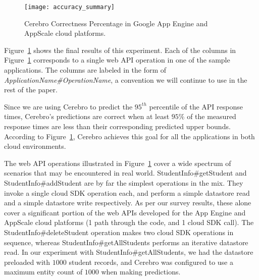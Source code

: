 \begin{figure}
\centering
\texttt{[image: accuracy\_summary]}
\caption{Cerebro Correctness Percentage in Google App Engine and AppScale cloud platforms.}
\label{fig:accuracy_summary}
\vspace{-0.2in}
\end{figure}

Figure~\ref{fig:accuracy_summary} shows the final results of this experiment.
Each of the columns in Figure~\ref{fig:accuracy_summary} corresponds 
to a single web API operation in 
one of the sample applications. The columns are labeled in the 
form of \textit{ApplicationName\#OperationName}, a convention 
we will continue to use in the rest of the paper. %

Since we are using Cerebro to predict the $95^{th}$ percentile of the API
response times, Cerebro's predictions are correct when at 
least $95\%$ of the measured response times are
less than their corresponding predicted upper bounds. According to
Figure~\ref{fig:accuracy_summary}, Cerebro achieves this goal for all the
applications in both cloud environments. 

The web API operations illustrated in Figure~\ref{fig:accuracy_summary} cover
a wide spectrum of scenarios that may be encountered in real world.
StudentInfo\#getStudent and StudentInfo\#addStudent are by far the simplest
operations in the mix. They invoke a single cloud SDK operation each, and
perform a simple datastore read and a simple datastore write respectively. As
per our survey results, these alone cover a significant portion of the web
APIs developed for the App Engine and AppScale cloud platforms (1 path through
the code, and 1 cloud SDK call).  The StudentInfo\#deleteStudent operation
makes two cloud SDK operations in sequence, whereas
StudentInfo\#getAllStudents performs an iterative datastore read.  In our
experiment with StudentInfo\#getAllStudents, we had the datastore preloaded
with $1000$ student records, and Cerebro was configured to use a maximum entity
count of $1000$ when making predictions.

